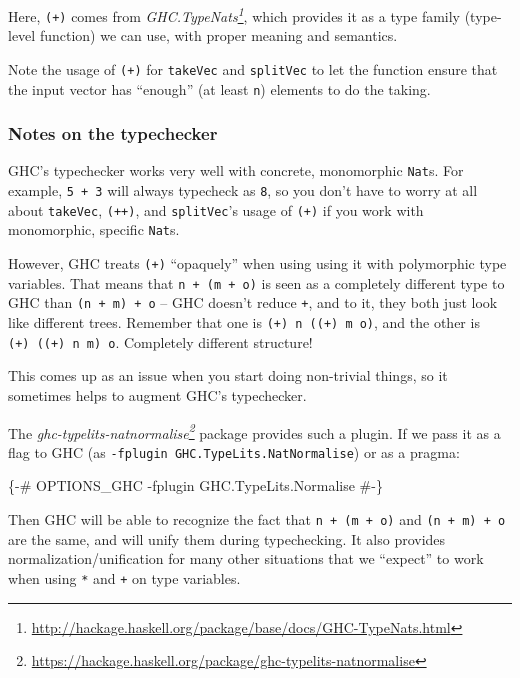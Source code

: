 \documentclass[]{article}
\newenvironment{Shaded}{}{}
\newcommand{\OtherTok}[1]{\textcolor[rgb]{0.00,0.44,0.13}{#1}}
\renewcommand{\href}[2]{#2\footnote{\url{#1}}}
\begin{document}
Here, \texttt{(+)} comes from
\emph{\href{http://hackage.haskell.org/package/base/docs/GHC-TypeNats.html}{GHC.TypeNats}},
which provides it as a type family (type-level function) we can use, with proper
meaning and semantics.

Note the usage of \texttt{(+)} for \texttt{takeVec} and \texttt{splitVec} to let
the function ensure that the input vector has ``enough'' (at least \texttt{n})
elements to do the taking.

\subsubsection{Notes on the typechecker}\label{notes-on-the-typechecker}

GHC's typechecker works very well with concrete, monomorphic \texttt{Nat}s. For
example, \texttt{5\ +\ 3} will always typecheck as \texttt{8}, so you don't have
to worry at all about \texttt{takeVec}, \texttt{(++)}, and \texttt{splitVec}'s
usage of \texttt{(+)} if you work with monomorphic, specific \texttt{Nat}s.

However, GHC treats \texttt{(+)} ``opaquely'' when using using it with
polymorphic type variables. That means that \texttt{n\ +\ (m\ +\ o)} is seen as
a completely different type to GHC than \texttt{(n\ +\ m)\ +\ o} -- GHC doesn't
reduce \texttt{+}, and to it, they both just look like different trees. Remember
that one is \texttt{(+)\ n\ ((+)\ m\ o)}, and the other is
\texttt{(+)\ ((+)\ n\ m)\ o}. Completely different structure!

This comes up as an issue when you start doing non-trivial things, so it
sometimes helps to augment GHC's typechecker.

The
\emph{\href{https://hackage.haskell.org/package/ghc-typelits-natnormalise}{ghc-typelits-natnormalise}}
package provides such a plugin. If we pass it as a flag to GHC (as
\texttt{-fplugin\ GHC.TypeLits.NatNormalise}) or as a pragma:

\begin{Shaded}
\begin{Highlighting}[]
\OtherTok{\{{-}\# OPTIONS\_GHC {-}fplugin GHC.TypeLits.Normalise \#{-}\}}
\end{Highlighting}
\end{Shaded}

Then GHC will be able to recognize the fact that \texttt{n\ +\ (m\ +\ o)} and
\texttt{(n\ +\ m)\ +\ o} are the same, and will unify them during typechecking.
It also provides normalization/unification for many other situations that we
``expect'' to work when using \texttt{*} and \texttt{+} on type variables.
\end{document}
